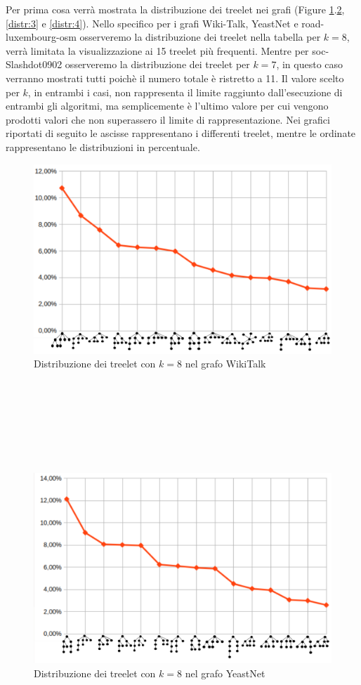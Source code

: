 Per prima cosa verrà mostrata la distribuzione dei treelet nei grafi (Figure \ref{distr:1}.\ref{distr:2},\ref{distr:3} e \ref{distr:4}).
Nello specifico per i grafi Wiki-Talk, YeastNet e road-luxembourg-osm osserveremo la distribuzione dei treelet nella tabella per $ k = 8 $, verrà limitata la visualizzazione ai 15 treelet più frequenti.
Mentre per soc-Slashdot0902 osserveremo la distribuzione dei treelet per $ k=7 $, in questo caso verranno mostrati tutti poichè il numero totale è ristretto a 11.
Il valore scelto per $ k $, in entrambi i casi, non rappresenta il limite raggiunto dall'esecuzione di entrambi gli algoritmi, ma semplicemente è l'ultimo valore per cui vengono prodotti valori che non superassero il limite di rappresentazione.
Nei grafici riportati di seguito le ascisse rappresentano i differenti treelet, mentre le ordinate rappresentano le distribuzioni in percentuale.
\renewcommand{\thefigure}{\arabic{figure}}
\begin{figure}[htbp]
	\centering
	\includegraphics[width=15.4cm]{capitolo4/grafoWIKI}
		\caption{Distribuzione dei treelet con $ k=8 $ nel grafo WikiTalk}
		\label{distr:1}
\end{figure}\mbox{}
\\\\\\\\\\\\
\begin{figure}[htbp]
	\centering
	\includegraphics[width=15.4cm]{capitolo4/grafoYEAST}
	\caption{Distribuzione dei treelet con $ k=8 $ nel grafo YeastNet}
	\label{distr:2}
\end{figure}
